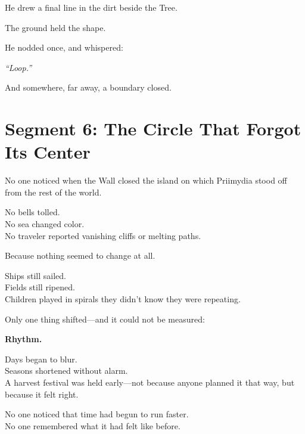 \documentclass[9pt]{article}
\begin{document}
\vspace{0.5em}
He drew a final line in the dirt beside the Tree.

\vspace{0.5em}
The ground held the shape.

\vspace{0.5em}
He nodded once, and whispered:

\vspace{0.5em}
\textit{``Loop.''}

\vspace{0.5em}
And somewhere, far away, a boundary closed.

\newpage

\section*{Segment 6: The Circle That Forgot Its Center}

No one noticed when the Wall closed the island on which Priimydia stood off from the rest of the world.

\vspace{0.5em}
No bells tolled.\\
No sea changed color.\\
No traveler reported vanishing cliffs or melting paths.

\vspace{0.5em}
Because nothing seemed to change at all.

\vspace{0.5em}
Ships still sailed.\\
Fields still ripened.\\
Children played in spirals they didn’t know they were repeating.

\vspace{0.5em}
Only one thing shifted---and it could not be measured:

\vspace{0.5em}
\textbf{Rhythm.}

\vspace{0.5em}
Days began to blur.\\
Seasons shortened without alarm.\\
A harvest festival was held early---not because anyone planned it that way, but because it felt right.

\vspace{0.5em}
No one noticed that time had begun to run faster.\\
No one remembered what it had felt like before.
\end{document}
